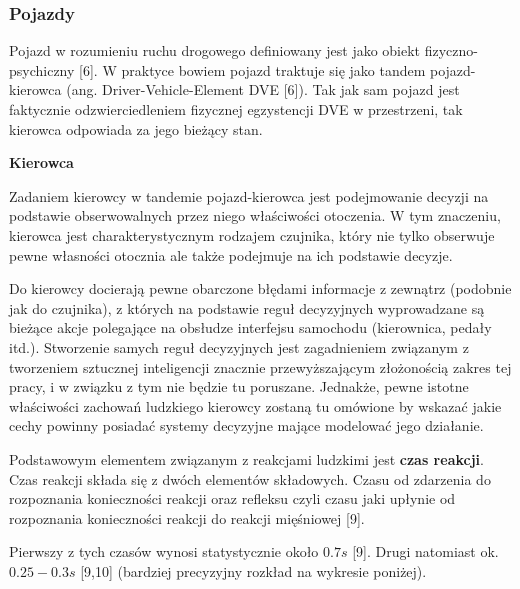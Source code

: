 {{\subsubsection{Pojazdy}
\par{
Pojazd w rozumieniu ruchu drogowego definiowany jest jako obiekt fizyczno-psychiczny [6]. W praktyce bowiem pojazd traktuje się jako tandem pojazd-kierowca (ang. Driver-Vehicle-Element DVE [6]). Tak jak sam pojazd jest faktycznie odzwierciedleniem fizycznej egzystencji DVE w przestrzeni, tak kierowca odpowiada za jego bieżący stan.
}
\par{ }
\par{
\textbf{Kierowca}
}
\par{
Zadaniem kierowcy w tandemie pojazd-kierowca jest podejmowanie decyzji na podstawie obserwowalnych przez niego właściwości otoczenia. W tym znaczeniu, kierowca jest charakterystycznym rodzajem czujnika, który nie tylko obserwuje pewne własności otocznia ale także podejmuje na ich podstawie decyzje.
}
\par{
Do kierowcy docierają pewne obarczone błędami informacje z zewnątrz (podobnie jak do czujnika), z których na podstawie reguł decyzyjnych wyprowadzane są bieżące akcje polegające na obsłudze interfejsu samochodu (kierownica, pedały itd.). Stworzenie samych reguł decyzyjnych jest zagadnieniem związanym z tworzeniem sztucznej inteligencji znacznie przewyższającym złożonością zakres tej pracy, i w związku z tym nie będzie tu poruszane. Jednakże, pewne istotne właściwości zachowań ludzkiego kierowcy zostaną tu omówione by wskazać jakie cechy powinny posiadać systemy decyzyjne mające modelować jego działanie.
}
\par{
Podstawowym elementem związanym z reakcjami ludzkimi jest \textbf{czas reakcji}. Czas reakcji składa się z dwóch elementów składowych. Czasu od zdarzenia do rozpoznania konieczności reakcji oraz refleksu czyli czasu jaki upłynie od rozpoznania konieczności reakcji do reakcji mięśniowej [9].
}
\par{
Pierwszy z tych czasów wynosi statystycznie około $0.7s$ [9]. Drugi natomiast ok. $0.25-0.3s$ [9,10] (bardziej precyzyjny rozkład na wykresie poniżej).
}
\par{
\begin{center}

\end{center}}}}
